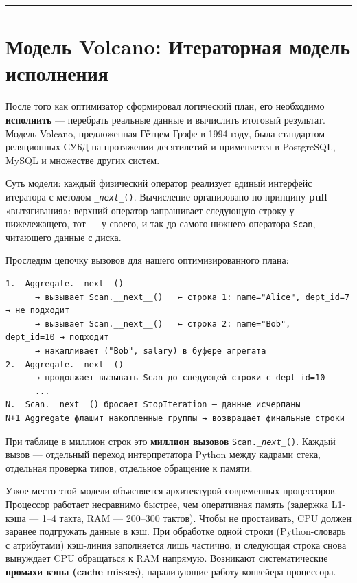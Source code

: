 \documentclass[a4paper,12pt]{report}
\begin{document}
{\vspace{0.5cm}\hrule\vspace{0.5cm}

\section{Модель Volcano: Итераторная модель исполнения}

После того как оптимизатор сформировал логический план, его необходимо \textbf{исполнить} — перебрать реальные данные и вычислить итоговый результат. Модель Volcano, предложенная Гётцем Грэфе в 1994 году, была стандартом реляционных СУБД на протяжении десятилетий и применяется в PostgreSQL, MySQL и множестве других систем.

Суть модели: каждый физический оператор реализует единый интерфейс итератора с методом \texttt{\textit{\_next\_}()}. Вычисление организовано по принципу \textbf{pull} — «вытягивания»: верхний оператор запрашивает следующую строку у нижележащего, тот — у своего, и так до самого нижнего оператора \texttt{Scan}, читающего данные с диска.

Проследим цепочку вызовов для нашего оптимизированного плана:

\begin{verbatim}
1.  Aggregate.__next__()
      → вызывает Scan.__next__()   ← строка 1: name="Alice", dept_id=7 → не подходит
      → вызывает Scan.__next__()   ← строка 2: name="Bob",   dept_id=10 → подходит
      → накапливает ("Bob", salary) в буфере агрегата
2.  Aggregate.__next__()
      → продолжает вызывать Scan до следующей строки с dept_id=10
      ...
N.  Scan.__next__() бросает StopIteration — данные исчерпаны
N+1 Aggregate флашит накопленные группы → возвращает финальные строки
\end{verbatim}

При таблице в миллион строк это \textbf{миллион вызовов} \texttt{Scan.\textit{\_next\_}()}. Каждый вызов — отдельный переход интерпретатора Python между кадрами стека, отдельная проверка типов, отдельное обращение к памяти.

Узкое место этой модели объясняется архитектурой современных процессоров. Процессор работает несравнимо быстрее, чем оперативная память (задержка L1-кэша — 1–4 такта, RAM — 200–300 тактов). Чтобы не простаивать, CPU должен заранее подгружать данные в кэш. При обработке одной строки (Python-словарь с атрибутами) кэш-линия заполняется лишь частично, и следующая строка снова вынуждает CPU обращаться к RAM напрямую. Возникают систематические \textbf{промахи кэша (cache misses)}, парализующие работу конвейера процессора.

}
\end{document}
